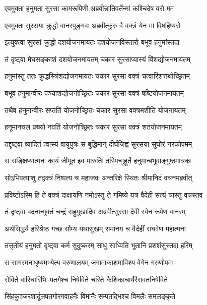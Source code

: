 \twolineshloka
{एवमुक्ता हनुमता सुरसा कामरूपिणी}
{अब्रवीन्नातिवर्तेन्मां कश्चिदेष वरो मम} %

\twolineshloka
{एवमुक्तः सुरसया क्रुद्धो वानरपुङ्गवः}
{अब्रवीत्कुरु वै वक्त्रं येन मां विषहिष्यसे} %

\twolineshloka
{इत्युक्त्वा सुरसां क्रुद्धो दशयोजनमायतः}
{दशयोजनविस्तारो बभूव हनुमांस्तदा} %

\twolineshloka
{तं दृष्ट्वा मेघसङ्काशं दशयोजनमायतम्}
{चकार सुरसाप्यास्यं विंशद्योजनमायतम्} %

\twolineshloka
{हनुमांस्तु ततः क्रुद्धस्त्रिंशद्योजनमायतः}
{चकार सुरसा वक्त्रं चत्वारिंशत्तथोच्छ्रितम्} %

\twolineshloka
{बभूव हनुमान्वीरः पञ्चाशद्योजनोच्छ्रितः}
{चकार सुरसा वक्त्रं षष्टियोजनमायतम्} %

\twolineshloka
{तथैव हनुमान्वीरः सप्ततिं योजनोच्छ्रितः}
{चकार सुरसा वक्त्रमशीतिं योजनायतम्} %

\twolineshloka
{हनूमानचल प्रख्यो नवतिं योजनोच्छ्रितः}
{चकार सुरसा वक्त्रं शतयोजनमायतम्} %

\twolineshloka
{तद्दृष्ट्वा व्यादितं त्वास्यं वायुपुत्रः स बुद्धिमान्}
{दीर्घजिह्वं सुरसया सुघोरं नरकोपमम्} %

\twolineshloka
{स सङ्क्षिप्यात्मनः कायं जीमूत इव मारुतिः}
{तस्मिन्मुहूर्ते हनुमान्बभूवाङ्गुष्ठमात्रकः} %

\twolineshloka
{सोऽभिपत्याशु तद्वक्त्रं निष्पत्य च महाजवः}
{अन्तरिक्षे स्थितः श्रीमानिदं वचनमब्रवीत्} %

\twolineshloka
{प्रविष्टोऽस्मि हि ते वक्त्रं दाक्षायणि नमोऽस्तु ते}
{गमिष्ये यत्र वैदेही सत्यं चास्तु वचस्तव} %

\twolineshloka
{तं दृष्ट्वा वदनान्मुक्तं चन्द्रं राहुमुखादिव}
{अब्रवीत्सुरसा देवी स्वेन रूपेण वानरम्} %

\twolineshloka
{अर्थसिद्ध्यै हरिश्रेष्ठ गच्छ सौम्य यथासुखम्}
{समानय च वैदेहीं राघवेण महात्मना} %

\twolineshloka
{तत्तृतीयं हनुमतो दृष्ट्वा कर्म सुदुष्करम्}
{साधु साध्विति भूतानि प्रशशंसुस्तदा हरिम्} %

\twolineshloka
{स सागरमनाधृष्यमभ्येत्य वरुणालयम्}
{जगामाकाशमाविश्य वेगेन गरुणोपमः} %

\twolineshloka
{सेविते वारिधारिभिः पतगैश्च निषेविते}
{चरिते कैशिकाचार्यैरैरावतनिषेविते} %

\twolineshloka
{सिंहकुञ्जरशार्दूलपतगोरगवाहनैः}
{विमानैः सम्पतद्भिश्च विमलैः समलङ्कृते} %

